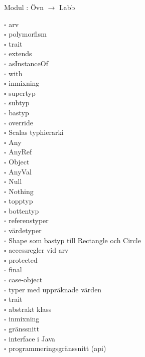 
    Modul : Övn  $\rightarrow$ Labb 
    \begin{multicols}{3}\SlideFontTiny
    $\square$ arv \\
$\square$ polymorfism \\
$\square$ trait \\
$\square$ extends \\
$\square$ asInstanceOf \\
$\square$ with \\
$\square$ inmixning \\
$\square$ supertyp \\
$\square$ subtyp \\
$\square$ bastyp \\
$\square$ override \\
$\square$ Scalas typhierarki \\
$\square$ Any \\
$\square$ AnyRef \\
$\square$ Object \\
$\square$ AnyVal \\
$\square$ Null \\
$\square$ Nothing \\
$\square$ topptyp \\
$\square$ bottentyp \\
$\square$ referenstyper \\
$\square$ värdetyper \\
$\square$ Shape som bastyp till Rectangle och Circle \\
$\square$ accessregler vid arv \\
$\square$ protected \\
$\square$ final \\
$\square$ case-object \\
$\square$ typer med uppräknade värden \\
$\square$ trait \\
$\square$ abstrakt klass \\
$\square$ inmixning \\
$\square$ gränssnitt \\
$\square$ interface i Java \\
$\square$ programmeringsgränssnitt (api) \\
    \end{multicols}
    
